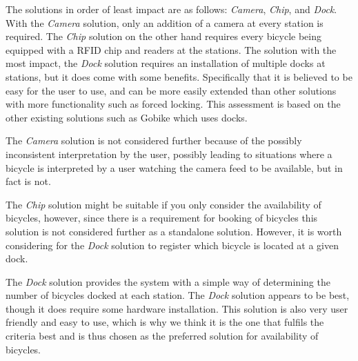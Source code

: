 The solutions in order of least impact are as follows: \textit{Camera}, \textit{Chip}, and \textit{Dock}.
With the \textit{Camera} solution, only an addition of a camera at every station is required. 
The \textit{Chip} solution on the other hand requires every bicycle being equipped with a RFID chip and readers at the stations.
The solution with the most impact, the \textit{Dock} solution requires an installation of multiple docks at stations, but it does come with some benefits.
Specifically that it is believed to be easy for the user to use, and can be more easily extended than other solutions with more functionality such as forced locking.
This assessment is based on the other existing solutions such as Gobike which uses docks.

The \textit{Camera} solution is not considered further because of the possibly inconsistent interpretation by the user, possibly leading to situations where a bicycle is interpreted by a user watching the camera feed to be available, but in fact is not.

The \textit{Chip} solution might be suitable if you only consider the availability of bicycles, however, since there is a requirement for booking of bicycles this solution is not considered further as a standalone solution.
However, it is worth considering for the \textit{Dock} solution to register which bicycle is located at a given dock.

The \textit{Dock} solution provides the system with a simple way of determining the number of bicycles docked at each station.
The \textit{Dock} solution appears to be best, though it does require some hardware installation.
This solution is also very user friendly and easy to use, which is why we think it is the one that fulfils the criteria best and is thus chosen as the preferred solution for availability of bicycles.